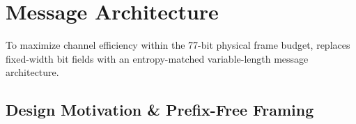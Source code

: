 %
%
%
%
%
%


\section{Message Architecture}
\label{sec:msg_arch}
\label{sec:typedetails}
\label{sec:huffman}

To maximize channel efficiency within the 77-bit physical frame budget, \LQ{} replaces fixed-width bit fields with an entropy-matched variable-length message architecture.

\subsection{Design Motivation \& Prefix-Free Framing}
\label{sec:huffman:motivation}

